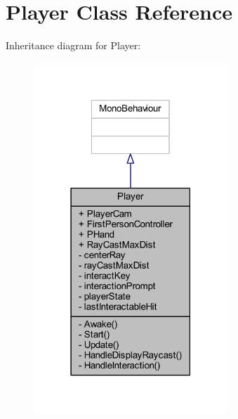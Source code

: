\hypertarget{class_player}{}\section{Player Class Reference}
\label{class_player}


Inheritance diagram for Player\+:\nopagebreak
\begin{figure}[H]
\begin{center}
\leavevmode
\includegraphics[width=207pt]{class_player__inherit__graph}
\end{center}
\end{figure}


